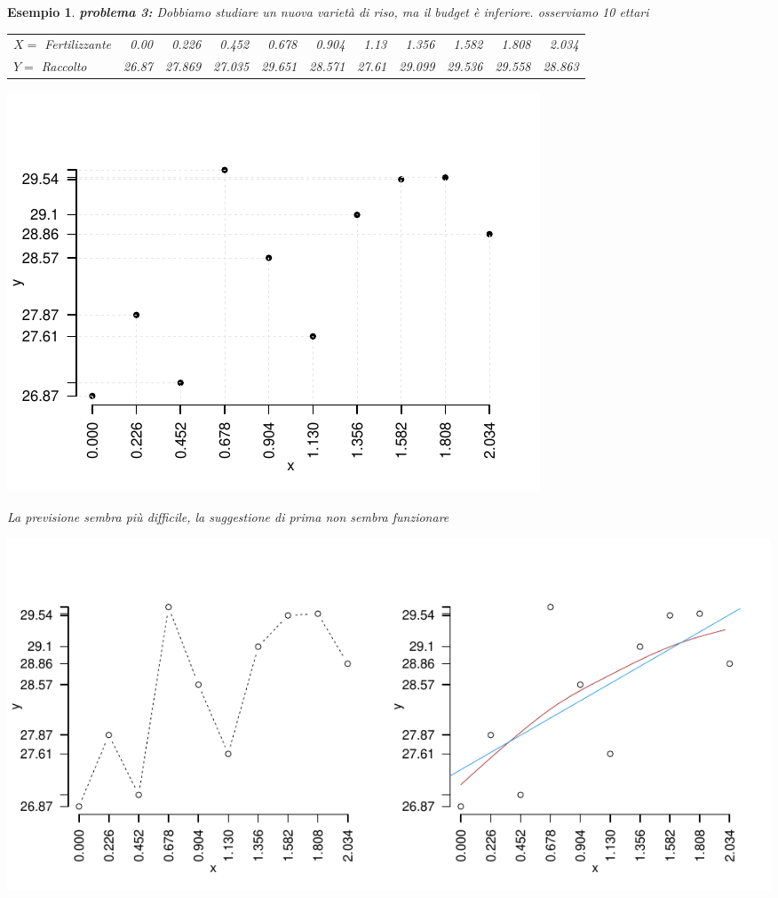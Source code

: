 \documentclass[
  11pt,
]{book}
\theoremstyle{mytheoremstyle}
\theoremstyle{mydefstyle}
\newtheorem{example}{{Esempio}}[section]
\begin{document}
\begin{example}

\textbf{problema 3:} Dobbiamo studiare un nuova varietà di riso, ma il budget è inferiore.
osserviamo 10 ettari

\begin{tabular}{lrrrrrrrrrr}
\toprule
$X=$ Fertilizzante & 0.00 & 0.226 & 0.452 & 0.678 & 0.904 & 1.13 & 1.356 & 1.582 & 1.808 & 2.034\\
$Y=$ Raccolto & 26.87 & 27.869 & 27.035 & 29.651 & 28.571 & 27.61 & 29.099 & 29.536 & 29.558 & 28.863\\
\bottomrule
\end{tabular}

\begin{center}\includegraphics{Appunti_di_Statistica_2025_files/figure-latex/17-regressione-I-15-1} \end{center}

La previsione sembra più difficile,
la suggestione di prima non sembra funzionare

\begin{center}\includegraphics{Appunti_di_Statistica_2025_files/figure-latex/17-regressione-I-2-1} \end{center}

\end{example}
\end{document}
